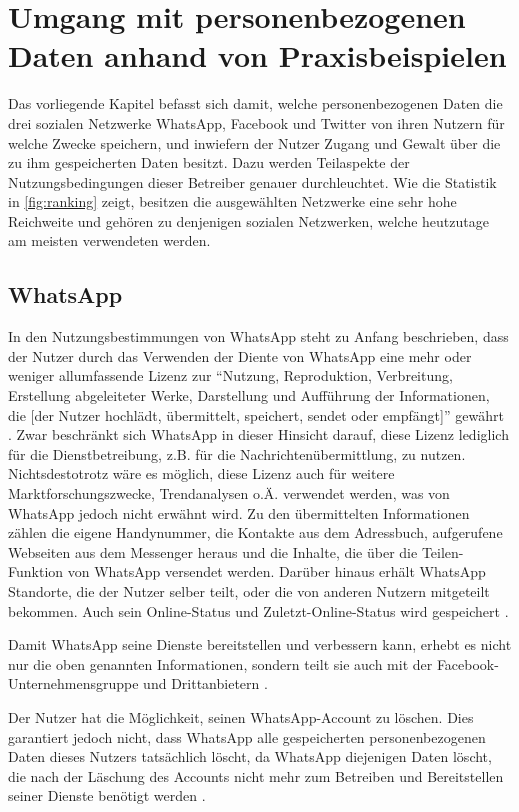 


\chapter{Umgang mit personenbezogenen Daten anhand von Praxisbeispielen}
Das vorliegende Kapitel befasst sich damit, welche personenbezogenen Daten die drei sozialen Netzwerke WhatsApp, Facebook und Twitter von ihren Nutzern für welche Zwecke speichern, und inwiefern der Nutzer Zugang und Gewalt über die zu ihm gespeicherten Daten besitzt. Dazu werden Teilaspekte der Nutzungsbedingungen dieser Betreiber genauer durchleuchtet. Wie die Statistik in \vref{fig:ranking} zeigt, besitzen die ausgewählten Netzwerke eine sehr hohe Reichweite und gehören zu denjenigen sozialen Netzwerken, welche heutzutage am meisten verwendeten werden.

\section{WhatsApp}
In den Nutzungsbestimmungen von WhatsApp steht zu Anfang beschrieben, dass der Nutzer durch das Verwenden der Diente von WhatsApp eine mehr oder weniger allumfassende Lizenz zur "`Nutzung, Reproduktion, Verbreitung, Erstellung abgeleiteter Werke, Darstellung und Aufführung der Informationen, die [der Nutzer hochlädt, übermittelt, speichert, sendet oder empfängt]"' gewährt \autocite[][]{WhatsAppInc..2017}. Zwar beschränkt sich WhatsApp in dieser Hinsicht darauf, diese Lizenz lediglich für die Dienstbetreibung, z.B. für die Nachrichtenübermittlung, zu nutzen. Nichtsdestotrotz wäre es möglich, diese Lizenz auch für weitere Marktforschungszwecke, Trendanalysen o.Ä. verwendet werden, was von WhatsApp jedoch nicht erwähnt wird. Zu den übermittelten Informationen zählen die eigene Handynummer, die Kontakte aus dem Adressbuch, aufgerufene Webseiten aus dem Messenger heraus und die Inhalte, die über die Teilen-Funktion von WhatsApp versendet werden. Darüber hinaus erhält WhatsApp Standorte, die der Nutzer selber teilt, oder die von anderen Nutzern mitgeteilt bekommen. Auch sein Online-Status und Zuletzt-Online-Status wird gespeichert \autocite[vgl.][]{WhatsAppInc..2017}.
\par
Damit WhatsApp seine Dienste bereitstellen und verbessern kann, erhebt es nicht nur die oben genannten Informationen, sondern teilt sie auch mit der Facebook-Unternehmensgruppe und Drittanbietern \autocite[vgl.][]{WhatsAppInc..2017}.
\par
Der Nutzer hat die Möglichkeit, seinen WhatsApp-Account zu löschen. Dies garantiert jedoch nicht, dass WhatsApp alle gespeicherten personenbezogenen Daten dieses Nutzers tatsächlich löscht, da WhatsApp diejenigen Daten löscht, die nach der Läschung des Accounts nicht mehr zum Betreiben und Bereitstellen seiner Dienste benötigt werden \autocite[vgl.][]{WhatsAppInc..2017}.

